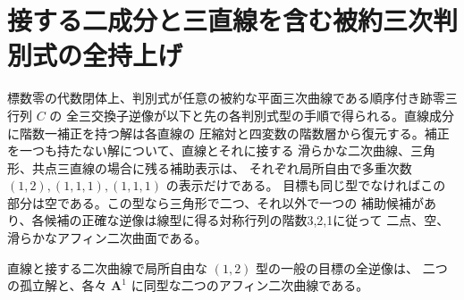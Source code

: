 \section{接する二成分と三直線を含む被約三次判別式の全持上げ}
\label{sec:marked-reduced-cubic-commutators}
\begin{theorem}\label{thm:marked-reduced-cubic-commutators}
標数零の代数閉体上、判別式が任意の被約な平面三次曲線である順序付き跡零三行列 $C$ の
全三交換子逆像が以下と先の各判別式型の手順で得られる。直線成分に階数一補正を持つ解は各直線の
圧縮対と四変数の階数層から復元する。補正を一つも持たない解について、直線とそれに接する
滑らかな二次曲線、三角形、共点三直線の場合に残る補助表示は、
それぞれ局所自由で多重次数 $(1,2),(1,1,1),(1,1,1)$ の表示だけである。
目標も同じ型でなければこの部分は空である。この型なら三角形で二つ、それ以外で一つの
補助候補があり、各候補の正確な逆像は線型に得る対称行列の階数3,2,1に従って
二点、空、滑らかなアフィン二次曲面である。

直線と接する二次曲線で局所自由な $(1,2)$ 型の一般の目標の全逆像は、
二つの孤立解と、各々 $\mathbf A^1$ に同型な二つのアフィン二次曲線である。
\end{theorem}

